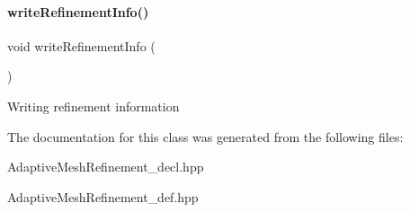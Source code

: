 \paragraph{\texorpdfstring{write\+Refinement\+Info()}{writeRefinementInfo()}}
{\footnotesize\ttfamily void write\+Refinement\+Info (\begin{DoxyParamCaption}{ }\end{DoxyParamCaption})}

Writing refinement information 

The documentation for this class was generated from the following files\+:\begin{DoxyCompactItemize}
\item 
Adaptive\+Mesh\+Refinement\+\_\+decl.\+hpp\item 
Adaptive\+Mesh\+Refinement\+\_\+def.\+hpp\end{DoxyCompactItemize}
